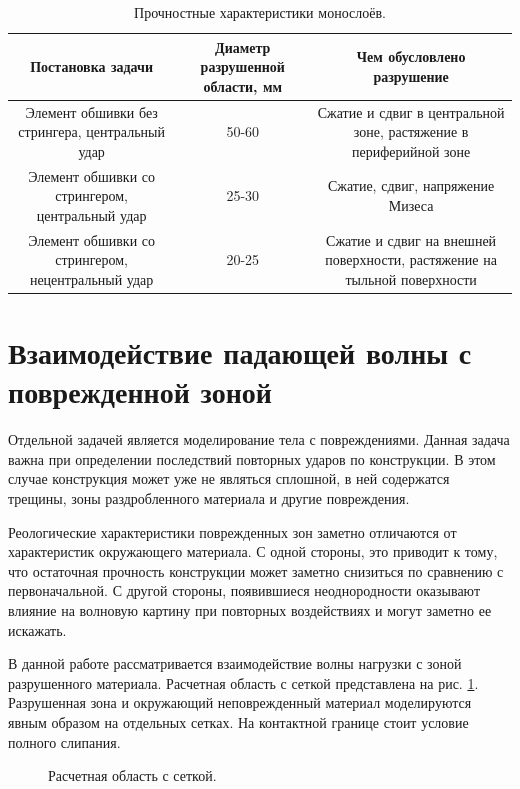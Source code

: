 \begin{table}
\centering
\begin{tabular}{|c|c|c|}
\hline
Постановка задачи & Диаметр разрушенной области, мм & Чем обусловлено разрушение \\
\hline
Элемент обшивки без стрингера, центральный удар & 50-60 & Сжатие и сдвиг в центральной зоне, растяжение в периферийной зоне \\
Элемент обшивки со стрингером, центральный удар & 25-30 & Сжатие, сдвиг, напряжение Мизеса \\
Элемент обшивки со стрингером, нецентральный удар & 20-25 & Сжатие и сдвиг на внешней поверхности, растяжение на тыльной поверхности \\
\hline
\end{tabular}
\caption{Прочностные характеристики монослоёв.}
\label{tbl:destruction_summary}
\end{table}



\clearpage
\newpage


\section{Взаимодействие падающей волны с поврежденной зоной}

Отдельной задачей является моделирование тела с повреждениями. Данная задача важна при определении последствий повторных ударов по конструкции. В этом случае конструкция может уже не являться сплошной, в ней содержатся трещины, зоны раздробленного материала и другие повреждения.

Реологические характеристики поврежденных зон заметно отличаются от характеристик окружающего материала. С одной стороны, это приводит к тому, что остаточная прочность конструкции может заметно снизиться по сравнению с первоначальной. С другой стороны, появившиеся неоднородности оказывают влияние на волновую картину при повторных воздействиях и могут заметно ее искажать.

В данной работе рассматривается взаимодействие волны нагрузки с зоной разрушенного материала. Расчетная область с сеткой представлена на рис. \ref{pic:crack_mesh}. Разрушенная зона и окружающий неповрежденный материал моделируются явным образом на отдельных сетках. На контактной границе стоит условие полного слипания.

\begin{figure}[htp]
\caption{Расчетная область с сеткой.}
\label{pic:crack_mesh}
\end{figure}

